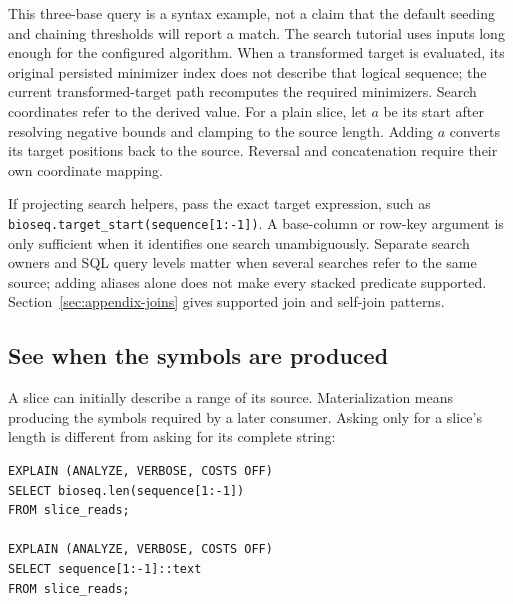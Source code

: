 This three-base query is a syntax example, not a claim that the default
seeding and chaining thresholds will report a match. The search tutorial
uses inputs long enough for the configured algorithm. When a transformed
target is evaluated, its original persisted minimizer index does not
describe that logical sequence; the current transformed-target path
recomputes the required minimizers. Search coordinates refer to the derived
value. For a plain slice, let $a$ be its start after resolving negative bounds
and clamping to the source length. Adding $a$ converts its target positions
back to the source. Reversal and concatenation require
their own coordinate mapping.

If projecting search helpers, pass the exact target expression, such as
\nolinkurl{bioseq.target_start(sequence[1:-1])}. A base-column or row-key
argument is only sufficient when it identifies one search unambiguously.
Separate search owners and SQL query levels matter when several searches
refer to the same source; adding aliases alone does not make every stacked
predicate supported. Section~\ref{sec:appendix-joins} gives supported join and
self-join patterns.

\subsection{See when the symbols are produced}

A slice can initially describe a range of its source. Materialization means
producing the symbols required by a later consumer. Asking only for a
slice's length is different from asking for its complete string:

\par\noindent\begin{minipage}{\linewidth}
\begin{lstlisting}[style=bioseq-appendix-sql]
EXPLAIN (ANALYZE, VERBOSE, COSTS OFF)
SELECT bioseq.len(sequence[1:-1])
FROM slice_reads;

EXPLAIN (ANALYZE, VERBOSE, COSTS OFF)
SELECT sequence[1:-1]::text
FROM slice_reads;
\end{lstlisting}
\end{minipage}

